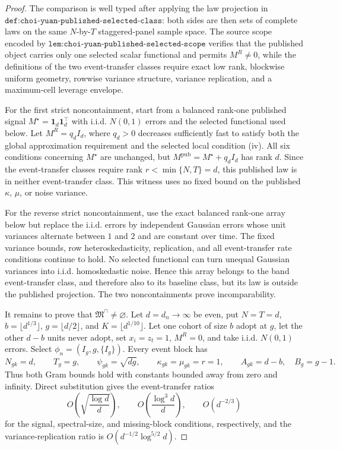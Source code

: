 \documentclass{article}
\begin{document}
\begin{proof}
The comparison is well typed after applying the law projection in
\(\texttt{def:choi-yuan-published-selected-class}\): both sides are then
sets of complete laws on the same \(N\)-by-\(T\) staggered-panel sample
space.  The source scope encoded by
\(\texttt{lem:choi-yuan-published-selected-scope}\) verifies that the
published object carries only one selected scalar functional and permits
\(M^R\ne0\), while the definitions of the two event-transfer classes
require exact low rank, blockwise uniform geometry, rowwise variance
structure, variance replication, and a maximum-cell leverage envelope.

For the first strict noncontainment, start from a balanced rank-one
published signal \(M^\star=\mathbf1_d\mathbf1_d^\top\) with i.i.d.
\(N(0,1)\) errors and the selected functional used below.  Let
\(M^R=q_dI_d\), where \(q_d>0\) decreases sufficiently fast to satisfy
both the global approximation requirement and the selected local
condition (iv).  All six conditions concerning \(M^\star\) are unchanged,
but \(M^{\mathrm{pub}}=M^\star+q_dI_d\) has rank \(d\).  Since the
event-transfer classes require rank \(r<\min\{N,T\}=d\), this published
law is in neither event-transfer class.  This witness uses no fixed bound
on the published \(\kappa\), \(\mu\), or noise variance.

For the reverse strict noncontainment, use the exact balanced rank-one
array below but replace the i.i.d. errors by independent Gaussian errors
whose unit variances alternate between \(1\) and \(2\) and are constant
over time.  The fixed variance bounds, row heteroskedasticity, replication,
and all event-transfer rate conditions continue to hold.  No selected
functional can turn unequal Gaussian variances into i.i.d. homoskedastic
noise.  Hence this array belongs to the band event-transfer class, and
therefore also to its baseline class, but its law is outside the published
projection.  The two noncontainments prove incomparability.

It remains to prove that \(\mathfrak M^\cap\ne\varnothing\).  Let
\(d=d_n\to\infty\) be even, put \(N=T=d\),
\(b=\lfloor d^{1/3}\rfloor\), \(g=\lfloor d/2\rfloor\), and
\(K=\lfloor d^{1/10}\rfloor\).  Let one cohort of size \(b\) adopt at
\(g\), let the other \(d-b\) units never adopt, set \(x_i=z_t=1\),
\(M^R=0\), and take i.i.d. \(N(0,1)\) errors.  Select
\(\phi_n=(I_g,g,\{I_g\})\).  Every event block has
\[
 N_{gk}=d,\qquad T_g=g,\qquad
 \psi_{gk}=\sqrt{dg},\qquad \kappa_{gk}=\mu_{gk}=r=1,
 \qquad A_{gk}=d-b,\quad B_g=g-1.
\]
Thus both Gram bounds hold with constants bounded away from zero and
infinity.  Direct substitution gives the event-transfer ratios
\[
 O\!\left(\sqrt{\frac{\log d}{d}}\right),\qquad
 O\!\left(\frac{\log^3d}{d}\right),\qquad
 O(d^{-2/3})
\]
for the signal, spectral-size, and missing-block conditions, respectively,
and the variance-replication ratio is
\(O(d^{-1/2}\log^{5/2}d)\).


\end{proof}
\end{document}
